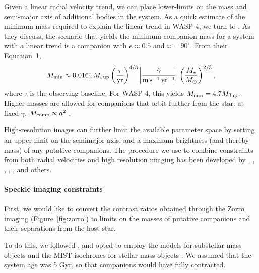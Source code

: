 \documentclass[12pt,twocolumn,tighten]{aastex62}
\begin{document}
Given a linear radial velocity trend, we can place lower-limits on the
mass and semi-major axis of additional bodies in the system.  As a
quick estimate of the minimum mass required to explain the linear
trend in WASP-4, we turn to \citet{feng_california_2015}.  As they
discuss, the scenario that yields the minimum companion mass for a
system with a linear trend is a companion with $e\approx0.5$ and
$\omega=90^\circ$.  From their Equation~1,
\begin{equation}
 M_{\rm min} \approx 0.0164\,M_{\rm Jup}
  \left( \frac{\tau}{{\rm yr}} \right)^{4/3}
  \left| \frac{\dot{\gamma}}{{\rm m\,s^{-1}\,yr^{-1}}} \right|
  \left( \frac{M_\star}{{M_\odot}} \right)^{2/3},
\end{equation}
where $\tau$ is the observing baseline.  For WASP-4, this yields
$M_{\rm min} = 4.7 M_{\rm Jup}$.  Higher masses are allowed for
companions that orbit further from the star: at fixed $\dot{\gamma}$,
$M_{\rm comp} \propto a^2$
\citep{torres_substellar_1999,liu_crossing_2002}.

High-resolution images can further limit the available parameter space
by setting an upper limit on the semimajor axis, and a maximum
brightness (and thereby mass) of any putative companions.  The
procedure we use to combine constraints from both radial velocities
and high resolution imaging has been developed by
\citet{wright_linear_trends_2007}, \citet{crepp_trends_2012},
\citet{montet_trends_2014}, \citet{knutson_friends_2014},
\citet{bryan_statistics_2016,bryan_excess_2019}, and others.

\paragraph{Speckle imaging constraints}

First, we would like to convert the contrast ratios obtained through
the Zorro imaging (Figure~\ref{fig:zorro}) to limits on the masses of
putative companions and their separations from the host star.

To do this, we followed \citet{montet_trends_2014}, and opted to
employ the \citet{baraffe_evolutionary_2003} models for substellar
mass objects and the MIST isochrones for stellar mass objects
\citep{paxton_modules_2011,paxton_modules_2013,paxton_modules_2015,dotter_mesa_2016,choi_mesa_2016}.
We assumed that the system age was 5 Gyr, so that companions would
have fully contracted.
\end{document}
